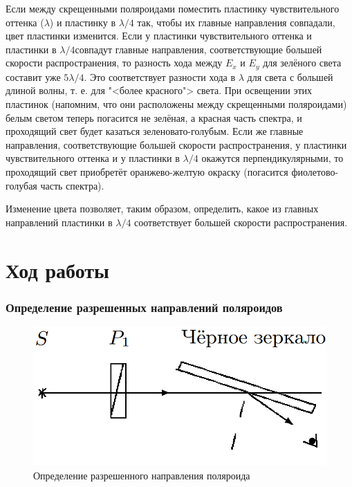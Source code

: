 \documentclass[a4paper,12pt]{article}
\begin{document}
Если между скрещенными поляроидами поместить пластинку чувствительного оттенка
($ \lambda $) и пластинку в $ \lambda/4 $ так, чтобы их главные
направления совпадали, цвет пластинки изменится. Если у пластинки чувствительного оттенка и пластинки в $ \lambda/4  $совпадут главные направления, соответствующие большей скорости распространения, то разность хода между $ E_x $ и $ E_y $ для зелёного света составит уже $ 5\lambda/4 $. Это соответствует разности хода в $ \lambda $ для света с большей длиной волны, т. е. для "<более красного"> света. При освещении
этих пластинок (напомним, что они расположены между скрещенными поляроидами) белым светом теперь погасится не зелёная, а красная
часть спектра, и проходящий свет будет казаться зеленовато-голубым.
Если же главные направления, соответствующие большей скорости распространения, у пластинки чувствительного оттенка и у пластинки
в $ \lambda/4 $ окажутся перпендикулярными, то проходящий свет приобретёт
оранжево-желтую окраску (погасится фиолетово-голубая часть спектра).

Изменение цвета позволяет, таким образом, определить, какое из
главных направлений пластинки в $ \lambda/4 $ соответствует большей скорости
распространения. 

\section*{Ход работы}

\subsubsection*{Определение разрешенных направлений поляроидов}

\begin{figure} 
	\includegraphics[width=\linewidth]{fig2}
	\caption{Определение разрешенного направления поляроида}
\end{figure}
\end{document}
